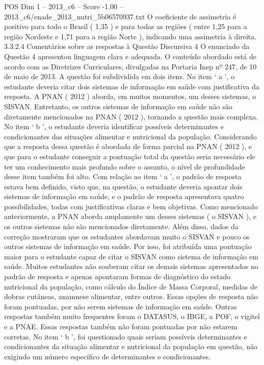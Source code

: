 \begin{textsample}{POS Dim 1 – 2013\_c6 – Score -1.00 – 2013\_c6/enade\_2013\_nutri\_5b06570937.txt}
O coeficiente de assimetria é positivo para todo o Brasil ( 1,35 ) e para todas as regiões ( entre 1,25 para a região Nordeste e 1,71 para a região Norte ), indicando uma assimetria à direita. 3.3.2.4 Comentários sobre as respostas à Questão Discursiva 4 O enunciado da Questão 4 apresentou linguagem clara e adequada.
O conteúdo abordado está de acordo com as Diretrizes Curriculares, divulgadas na Portaria Inep nº 247, de 10 de maio de 2013.
A questão foi subdividida em dois itens.
No item ‘ a ’, o estudante deveria citar dois sistemas de informação em saúde com justificativa da resposta.
A PNAN ( 2012 ) aborda, em muitos momentos, um desses sistemas, o SISVAN.
Entretanto, os outros sistemas de informação em saúde não são diretamente mencionados na PNAN ( 2012 ), tornando a questão mais complexa.
No item ‘ b ’, o estudante deveria identificar possíveis determinantes e condicionantes das situações alimentar e nutricional da população.
Considerando que a resposta dessa questão é abordada de forma parcial na PNAN ( 2012 ), e que para o estudante conseguir a pontuação total da questão seria necessário ele ter um conhecimento mais profundo sobre o assunto, o nível de profundidade desse item também foi alto.
Com relação ao item ‘ a ’, o padrão de resposta estava bem definido, visto que, na questão, o estudante deveria apontar dois sistemas de informação em saúde, e o padrão de resposta apresentava quatro possibilidades, todas com justificativas claras e bem objetivas.
Como mencionado anteriormente, a PNAN aborda amplamente um desses sistemas ( o SISVAN ), e os outros sistemas não são mencionados diretamente.
Além disso, dados da correção mostraram que os estudantes abordavam muito o SISVAN e pouco os outros sistemas de informação em saúde.
Por isso, foi atribuída uma pontuação maior para o estudante capaz de citar o SISVAN como sistema de informação em saúde.
Muitos estudantes não souberam citar os demais sistemas apresentados no padrão de resposta e apenas apontaram formas de diagnóstico do estado nutricional da população, como cálculo do Índice de Massa Corporal, medidas de dobras cutâneas, anamnese alimentar, entre outros.
Essas opções de resposta não foram pontuadas, por não serem sistemas de informação em saúde.
Outras respostas também muito frequentes foram o DATASUS, o IBGE, a POF, o vigitel e a PNAE.
Essas respostas também não foram pontuadas por não estarem corretas.
No item ‘ b ’, foi questionado quais seriam possíveis determinantes e condicionantes da situação alimentar e nutricional da população em questão, não exigindo um número específico de determinantes e condicionantes.

\end{textsample}
